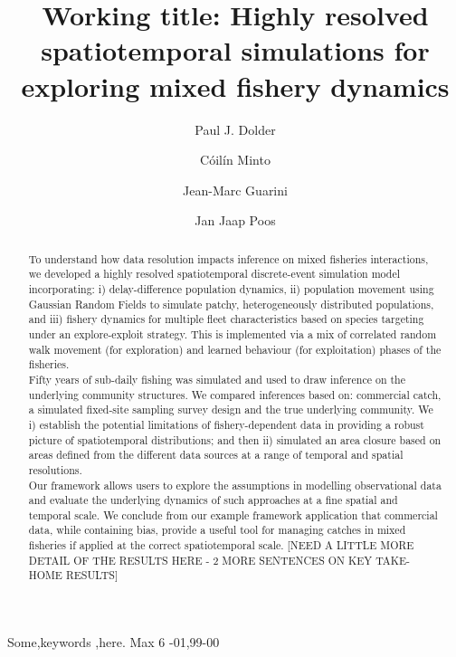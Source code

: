 \documentclass[review]{elsarticle}
\begin{document}
\begin{frontmatter}
\title{Working title: Highly resolved spatiotemporal simulations for
	exploring mixed fishery dynamics}

\author[1,2]{Paul J. Dolder}

\author[1]{Cóilín Minto}
\author[3]{Jean-Marc Guarini}
\author[4,5]{Jan Jaap Poos}

\address[1]{Galway-Mayo Institute of Technology (GMIT), Dublin Road, Galway,
	Ireland} 
\address[2]{Centre for Environment, Fisheries and Aquaculture Science (Cefas),
	Pakefield Road, Lowestoft, UK}
\address[3]{Sorbonne Université, Faculty of Sciences, 4 Place Jussieu, 75005
	Paris, France}
\address[4]{Wageningen Marine Research, Haringkade 1 1976 CP IJmuiden,
	Netherlands}
\address[5]{Aquaculture and Fisheries Group, Wageningen University \& Research,
	Zodiac Building 122, De Elst 1, 6708 WD Wageningen, the Netherlands}


\begin{abstract}

To understand how data resolution impacts inference on mixed fisheries
interactions, we developed a highly resolved spatiotemporal discrete-event
simulation model incorporating: i) delay-difference population dynamics, ii)
population movement using Gaussian Random Fields to simulate patchy,
heterogeneously distributed populations, and iii) fishery dynamics for multiple
fleet characteristics based on species targeting under an explore-exploit
strategy. This is implemented via a mix of correlated random walk movement (for
exploration) and learned behaviour (for exploitation) phases of the fisheries.
\\ 
Fifty years of sub-daily fishing was simulated and used to draw inference on
the underlying community structures. We compared inferences based on:
commercial catch, a simulated fixed-site sampling survey design and the true
underlying community. We i) establish the potential limitations of
fishery-dependent data in providing a robust picture of spatiotemporal
distributions; and then ii) simulated an area closure based on areas defined
from the different data sources at a range of temporal and spatial resolutions.
\\
Our framework allows users to explore the assumptions in modelling
observational data and evaluate the underlying dynamics of such approaches at a
fine spatial and temporal scale. We conclude from our example framework
application that commercial data, while containing bias, provide a useful tool
for managing catches in mixed fisheries if applied at the correct
spatiotemporal scale. [NEED A LITTLE MORE DETAIL OF THE RESULTS HERE - 2 MORE
SENTENCES ON KEY TAKE-HOME RESULTS]\\
\end{abstract}

\begin{keyword}
Some\sep keywords \sep here. Max 6 
-01\sep  99-00
\end{keyword}

\end{frontmatter}
\end{document}

